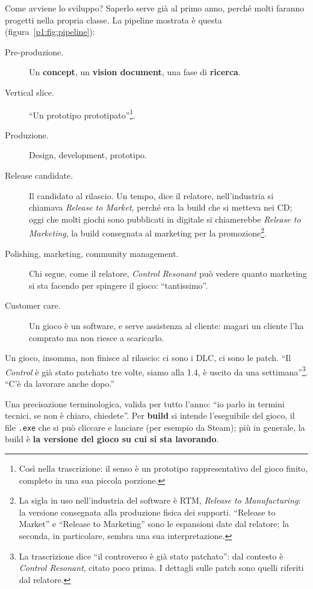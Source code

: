 Come avviene lo sviluppo? Saperlo serve già al primo anno, perché molti
faranno progetti nella propria classe. La pipeline mostrata è questa
(figura~\ref{p1:fig:pipeline}):
\begin{description}
  \item[Pre-produzione.] Un \textbf{concept}, un \textbf{vision document},
        una fase di \textbf{ricerca}.
  \item[Vertical slice.] ``Un prototipo prototipato''\footnote{Così nella
        trascrizione: il senso è un prototipo rappresentativo del gioco
        finito, completo in una sua piccola porzione.}.
  \item[Produzione.] Design, development, prototipo.
  \item[Release candidate.] Il candidato al rilascio. Un tempo, dice il
        relatore, nell'industria si chiamava \emph{Release to Market},
        perché era la build che si metteva nei CD; oggi che molti giochi
        sono pubblicati in digitale si chiamerebbe \emph{Release to
        Marketing}, la build consegnata al marketing per la
        promozione\footnote{La sigla in uso nell'industria del software è
        RTM, \emph{Release to Manufacturing}: la versione consegnata alla
        produzione fisica dei supporti. ``Release to Market'' e ``Release to
        Marketing'' sono le espansioni date dal relatore; la seconda, in
        particolare, sembra una sua interpretazione.}.
  \item[Polishing, marketing, community management.] Chi segue, come il
        relatore, \emph{Control Resonant} può vedere quanto marketing si
        sta facendo per spingere il gioco: ``tantissimo''.
  \item[Customer care.] Un gioco è un software, e serve assistenza al
        cliente: magari un cliente l'ha comprato ma non riesce a
        scaricarlo.
\end{description}
Un gioco, insomma, non finisce al rilascio: ci sono i DLC, ci sono le patch.
``Il \emph{Control} è già stato patchato tre volte, siamo alla 1.4, è uscito
da una settimana''\footnote{La trascrizione dice ``il controverso è già
stato patchato'': dal contesto è \emph{Control Resonant}, citato poco prima.
I dettagli sulle patch sono quelli riferiti dal relatore.}. ``C'è da
lavorare anche dopo.''

Una precisazione terminologica, valida per tutto l'anno: ``io parlo in
termini tecnici, se non è chiaro, chiedete''. Per \textbf{build} si intende
l'eseguibile del gioco, il file \texttt{.exe} che si può cliccare e lanciare
(per esempio da Steam); più in generale, la build è \textbf{la versione del
gioco su cui si sta lavorando}.

